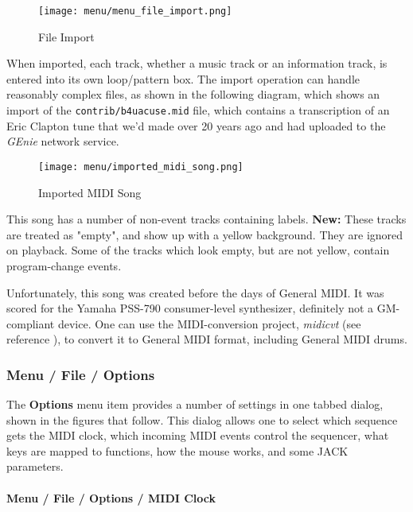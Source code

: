 \begin{figure}[H]
   \centering 
   \texttt{[image: menu/menu\_file\_import.png]}
   \caption{File Import}
   \label{fig:seq64_menu_file_import}
\end{figure}

   When imported, each track, whether a music track or an information track,
   is entered into its own loop/pattern box.  The import operation can
   handle reasonably complex files, as shown in the following diagram, which
   shows an import of the \texttt{contrib/b4uacuse.mid} file, which contains
   a transcription of an Eric Clapton tune that we'd made over 20 
   years ago and had uploaded to the \textsl{GEnie} network service.

\begin{figure}[H]
   \centering 
   \texttt{[image: menu/imported\_midi\_song.png]}
   \caption{Imported MIDI Song}
   \label{fig:seq64_imported_midi_song}
\end{figure}

   This song has a number of non-event tracks containing labels.
   \textbf{New:}
   These tracks are treated as "empty", and show up with a yellow
   background.  They are ignored on playback.   Some of the tracks
   which look empty, but are not yellow, contain program-change events.

   Unfortunately, this song was created before the days of General MIDI.
   It was scored for the Yamaha PSS-790 consumer-level synthesizer,
   definitely not a GM-compliant device.
   One can use the MIDI-conversion project, \textsl{midicvt}
   (see reference \cite{midicvt}),
   to convert it to General MIDI format, including General MIDI drums.

\subsubsection{Menu / File / Options}
\label{subsubsec:seq64_menu_file_options}

   The \textbf{Options} menu item provides a number of settings in one
   tabbed dialog, shown in the figures that follow.
   This dialog allows one to select which sequence gets the MIDI
   clock, which incoming MIDI events control the sequencer, what keys are
   mapped to functions, how the mouse works, and some JACK parameters.

\paragraph{Menu / File / Options / MIDI Clock}
\label{paragraph:seq64_menu_file_options_midi_clock}

